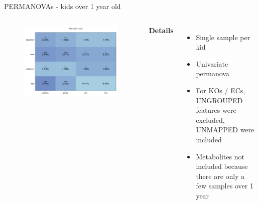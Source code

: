 \begin{frame}{PERMANOVAs - kids over 1 year old}
    \begin{columns}[c] %

    
        \begin{figure}
        \includegraphics[width=1\linewidth]{../figures/kids_over1y_permanovas.png}
        \end{figure}

    
        \textbf{Details}
        \begin{itemize}
            \item Single sample per kid
            \item Univariate permanova
            \item For KOs / ECs, UNGROUPED features were excluded, UNMAPPED were included
            \item Metabolites not included because there are only a few samples over 1 year
        \end{itemize}

    \end{columns}

\end{frame}


